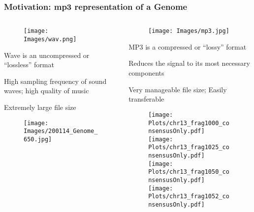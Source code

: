 \documentclass[10pt,dvipsnames,table]{beamer}
\begin{document}
\begin{frame}
\frametitle{Motivation: mp3 representation of a Genome}
\vspace{-0.5cm}
\begin{columns}[t]
\begin{column}{0.5\textwidth}
\vspace{-0.5cm}
\begin{figure}[t]
\texttt{[image: Images/wav.png]} 
\end{figure}

\vspace{-0.5cm}
\begin{itemize}
{\footnotesize{
\item Wave is an uncompressed or ``lossless'' format
\item High sampling frequency of sound waves; high quality of music
\item Extremely large file size
}}
\end{itemize}

\begin{figure}[H]
\texttt{[image: Images/200114\_Genome\_650.jpg]} 
\end{figure}

\end{column}

\begin{column}{0.5\textwidth}
\vspace{-0.5cm}
\begin{figure}[t]
\texttt{[image: Images/mp3.jpg]}
\end{figure}

\vspace{-0.5cm}
\begin{itemize}
{\footnotesize{
\item MP3 is a compressed or ``lossy'' format
\item Reduces the signal to its most necessary components
\item Very manageable file size; Easily transferable
}}
\end{itemize}
\vspace{-0.5cm}
\begin{figure}[H]
\hspace{-1cm}
\texttt{[image: Plots/chr13\_frag1000\_consensusOnly.pdf]} \\
\vspace{-0.5cm} \hspace{0.5cm}
\texttt{[image: Plots/chr13\_frag1025\_consensusOnly.pdf]} \\
\vspace{-0.5cm} \hspace{-2cm}
\texttt{[image: Plots/chr13\_frag1050\_consensusOnly.pdf]} \\
\vspace{-0.5cm} \hspace{1cm}
\texttt{[image: Plots/chr13\_frag1052\_consensusOnly.pdf]} \\
\end{figure}


\end{column}
\end{columns}
\end{frame}
\end{document}
